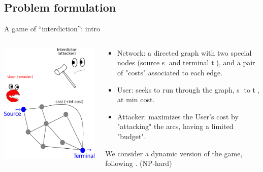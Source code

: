 \documentclass[10pt, xcolor=svgnames]{beamer}
\begin{document}
\subsection{Problem formulation}
\label{sec:orgc1d06ba}
\begin{frame}[label={sec:org2b30a3c}]{A game of ``interdiction'': intro}
\begin{columns}
\begin{column}[t]{0.4\columnwidth}
\begin{center}
\includegraphics[width=.9\linewidth]{./img/SPI.png}
\end{center}
\end{column}

\begin{column}[t]{0.6\columnwidth}
\begin{itemize}
\item \alert{Network:} a directed graph with two special nodes (source \textcircled{s} and terminal \textcircled{t}), and a pair of "costs" associated to each edge.
\item \alert{User:} seeks to run through the graph, \textcircled{s} to \textcircled{t}, at min cost.
\item \alert{Attacker:} maximizes the User's cost by "attacking" the arcs, having a limited "budget".
\end{itemize}

We consider a \alert{dynamic} version of the game, following \cite{sefair2016}. (NP-hard)
\end{column}
\end{columns}
\end{frame}
\end{document}
